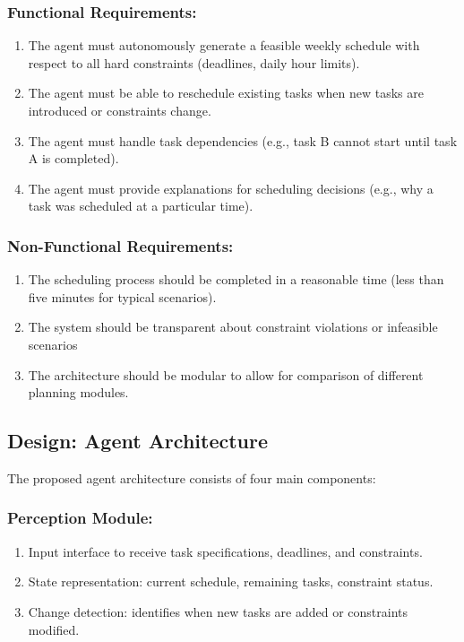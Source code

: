 \documentclass[12pt]{article}
\begin{document}
\subsubsection{Functional Requirements:}
\begin{enumerate}
    \item The agent must autonomously generate a feasible weekly schedule with respect to all hard constraints (deadlines, daily hour limits).
    \item The agent must be able to reschedule existing tasks when new tasks are introduced or constraints change.
    \item The agent must handle task dependencies (e.g., task B cannot start until task A is completed).
    \item The agent must provide explanations for scheduling decisions (e.g., why a task was scheduled at a particular time).
\end{enumerate}

\subsubsection{Non-Functional Requirements:}
\begin{enumerate}
    \item The scheduling process should be completed in a reasonable time (less than five minutes for typical scenarios).
    \item The system should be transparent about constraint violations or infeasible scenarios
    \item The architecture should be modular to allow for comparison of different planning modules.
\end{enumerate} 
\subsection{Design: Agent Architecture}
The proposed agent architecture consists of four main components:
\subsubsection{Perception Module:}
\begin{enumerate}
    \item Input interface to receive task specifications, deadlines, and constraints.
    \item State representation: current schedule, remaining tasks, constraint status.
    \item  Change detection: identifies when new tasks are added or constraints modified.
\end{enumerate}
\end{document}
